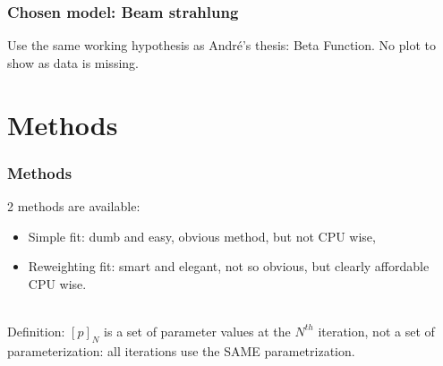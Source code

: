 \documentclass{beamer}
\begin{document}
\begin{frame}
\frametitle{Chosen model: Beam strahlung}
Use the same working hypothesis as Andr\'e's thesis: Beta Function. No plot to
show as data is missing.
\end{frame}

\section{Methods}
\begin{frame}
\frametitle{Methods}
2 methods are available:
\begin{itemize}
\item Simple fit: dumb and easy, obvious method, but not CPU wise,
\item Reweighting fit: smart and elegant, not so obvious, but clearly affordable CPU wise.
\end{itemize}
~\\
Definition: \alert{$[p]_N$ is a set of parameter values} at the $N^{th}$
iteration, not a set of parameterization: all iterations use the SAME parametrization.
\end{frame}
\end{document}
